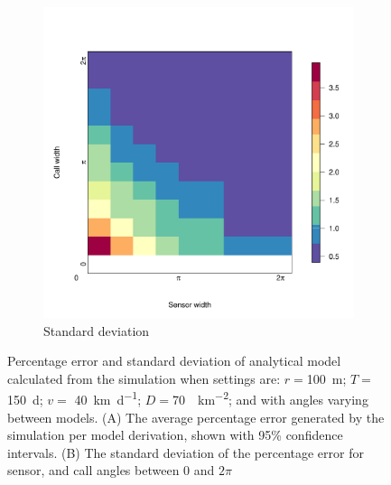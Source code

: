 \documentclass[a4paper,10pt,reqno,oneside]{amsart}
\begin{document}
\begin{figure}
\begin{subfigure}[t]{0.5\textwidth}
		\includegraphics[width=1\textwidth]{imgs/ResultStandardDeviation.pdf}
		\caption{Standard deviation}
		\label{f:StandardDevaition}
	\end{subfigure}
	\caption{Percentage error and standard deviation of analytical model calculated from the simulation when settings are: $r = $\SI{100}{\meter}; $T = $\SI{150}{\day}; $v = $ \SI{40}{\kilo\meter\per\day}; $D=$\SI{70}{\animals\per\kilo\meter\squared}; and with angles varying between models. (A) The average percentage error generated by the simulation per model derivation, shown with 95\% confidence intervals. (B) The standard deviation of the percentage error for sensor, and call angles between 0 and $2\pi$ }

\end{figure}
\end{document}
